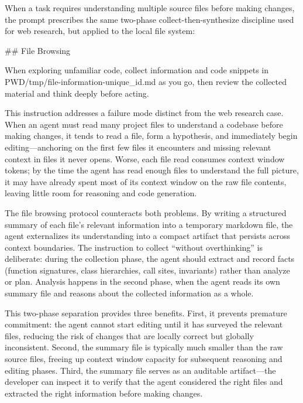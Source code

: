 \documentclass{article}
\begin{document}
When a task requires understanding multiple source files before making changes, the prompt prescribes the same two-phase collect-then-synthesize discipline used for web research, but applied to the local file system:

\begin{prompt}
## File Browsing

When exploring unfamiliar code, collect information and
code snippets in PWD/tmp/file-information-{unique_id}.md
as you go, then review the collected material and think
deeply before acting.
\end{prompt}

\noindent This instruction addresses a failure mode distinct from the web research case.  When an agent must read many project files to understand a codebase before making changes, it tends to read a file, form a hypothesis, and immediately begin editing---anchoring on the first few files it encounters and missing relevant context in files it never opens.  Worse, each file read consumes context window tokens; by the time the agent has read enough files to understand the full picture, it may have already spent most of its context window on the raw file contents, leaving little room for reasoning and code generation.

The file browsing protocol counteracts both problems.  By writing a structured summary of each file's relevant information into a temporary markdown file, the agent externalizes its understanding into a compact artifact that persists across context boundaries.  The instruction to collect ``without overthinking'' is deliberate: during the collection phase, the agent should extract and record facts (function signatures, class hierarchies, call sites, invariants) rather than analyze or plan.  Analysis happens in the second phase, when the agent reads its own summary file and reasons about the collected information as a whole.

This two-phase separation provides three benefits.  First, it prevents premature commitment: the agent cannot start editing until it has surveyed the relevant files, reducing the risk of changes that are locally correct but globally inconsistent.  Second, the summary file is typically much smaller than the raw source files, freeing up context window capacity for subsequent reasoning and editing phases.  Third, the summary file serves as an auditable artifact---the developer can inspect it to verify that the agent considered the right files and extracted the right information before making changes.
\end{document}
